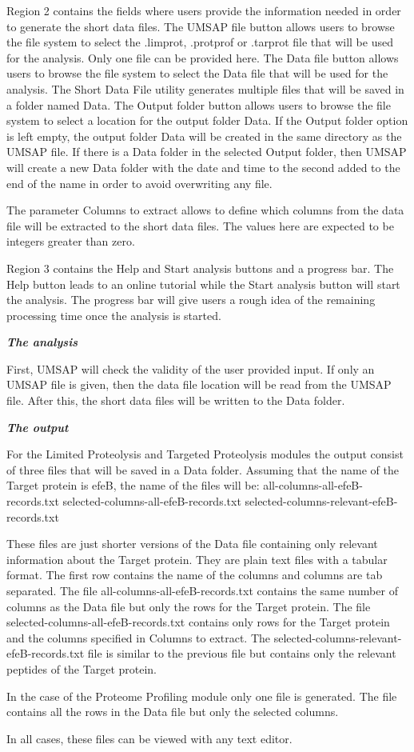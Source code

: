 Region \num{2} contains the fields where users provide the information needed in order to generate the short data files. The UMSAP file button allows users to browse the file system to select the .limprot, .protprof or .tarprot file that will be used for the analysis. Only one file can be provided here. The Data file button allows users to browse the file system to select the Data file that will be used for the analysis. The Short Data File utility generates multiple files that will be saved in a folder named Data. The Output folder button allows users to browse the file system to select a location for the output folder Data. If the Output folder option is left empty, the output folder Data will be created in the same directory as the UMSAP file. If there is a Data folder in the selected Output folder, then UMSAP will create a new Data folder with the date and time to the second added to the end of the name in order to avoid overwriting any file. 

The parameter Columns to extract allows to define which columns from the data file will be extracted to the short data files. The values here are expected to be integers greater than zero.

Region \num{3} contains the Help and Start analysis buttons and a progress bar. The Help button leads to an online tutorial while the Start analysis button will start the analysis. The progress bar will give users a rough idea of the remaining processing time once the analysis is started.

\textit{\textbf{The analysis}}

First, UMSAP will check the validity of the user provided input. If only an UMSAP file is given, then the data file location will be read from the UMSAP file. After this, the short data files will be written to the Data folder.

\textit{\textbf{The output}}

For the Limited Proteolysis and Targeted Proteolysis modules the output consist of three files that will be saved in a Data folder. Assuming that the name of the Target protein is efeB, the name of the files will be:\newline 
all-columns-all-efeB-records.txt \newline
selected-columns-all-efeB-records.txt \newline
selected-columns-relevant-efeB-records.txt

These files are just shorter versions of the Data file containing only relevant information about the Target protein. They are plain text files with a tabular format. The first row contains the name of the columns and columns are tab separated. The file all-columns-all-efeB-records.txt contains the same number of columns as the Data file but only the rows for the Target protein. The file selected-columns-all-efeB-records.txt contains only rows for the Target protein and the columns specified in Columns to extract. The selected-columns-relevant-efeB-records.txt file is similar to the previous file but contains only the relevant peptides of the Target protein. 

In the case of the Proteome Profiling module only one file is generated. The file contains all the rows in the Data file but only the selected columns.

In all cases, these files can be viewed with any text editor.





